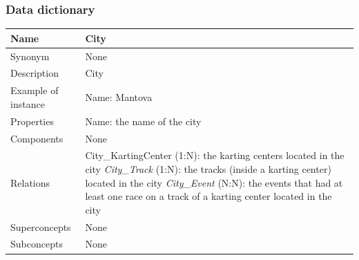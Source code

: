 \documentclass{beamer}
\begin{document}
\begin{frame}
\frametitle{Data dictionary}
\begin{table}
\tiny
\begin{tabular}{|p{2cm}|p{6cm}|}
\hline
Name & \textbf{City} \\
\hline
Synonym & None \\
\hline
Description & City \\
\hline
Example of instance & 
Name: Mantova \\
\hline
Properties & 
Name: the name of the city \\
\hline
Components & None \\
\hline
Relations &
City\_KartingCenter (1:N): the karting centers located in the city \newline
\textit{City\_Track} (1:N): the tracks (inside a karting center) located in the city \newline
\textit{City\_Event} (N:N): the events that had at least one race on a track of a karting center
located in the city \\
\hline
Superconcepts & None \\
\hline
Subconcepts & None \\
\hline
\end{tabular}
\end{table}
\end{frame}
\end{document}

